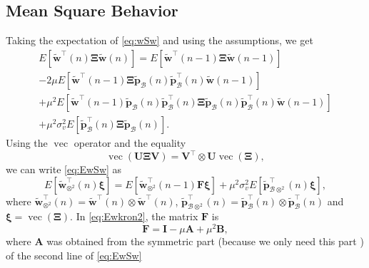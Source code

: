 \subsection{Mean Square Behavior}
Taking the expectation of \eqref{eq:wSw} and using the assumptions, we get
\begin{multline}
    E\left[ \tilde{\mathbf{w}}^\top(n)\boldsymbol{\Xi}\tilde{\mathbf{w}}(n)\right] = E\left[ \tilde{\mathbf{w}}^\top(n-1)\boldsymbol{\Xi}\tilde{\mathbf{w}}(n-1) \right]\\
    - 2\mu E\left[ \tilde{\mathbf{w}}^\top(n-1)\boldsymbol{\Xi}\tilde{\mathbf{p}}_{\mathcal{B}}(n)\tilde{\mathbf{p}}_{\mathcal{B}}^\top(n)\tilde{\mathbf{w}}(n-1) \right]\\
    +\mu^2 E\left[\tilde{\mathbf{w}}^{\top}(n-1)\tilde{\mathbf{p}}_{\mathcal{B}}(n)\tilde{\mathbf{p}}^\top_{\mathcal{B}}(n)\boldsymbol{\Xi}\tilde{\mathbf{p}}_{\mathcal{B}}(n)\tilde{\mathbf{p}}_{\mathcal{B}}^\top(n)\tilde{\mathbf{w}}(n-1)\right]\\
    +\mu^2 \sigma_{v}^2E\left[ \tilde{\mathbf{p}}^\top_{\mathcal{B}}(n)\boldsymbol{\Xi}\tilde{\mathbf{p}}_{\mathcal{B}}(n) \right].\label{eq:EwSw}
\end{multline}
Using the $\operatorname{vec}$ operator and the equality
\begin{equation*}
    \operatorname{vec}\left(\mathbf{U}\boldsymbol{\Xi}\mathbf{V}\right) = \mathbf{V}^\top\otimes\mathbf{U}\operatorname{vec}\left(\boldsymbol{\Xi}\right),
\end{equation*}
we can write \eqref{eq:EwSw} as
\begin{equation}
    E\left[ \tilde{\mathbf{w}}^\top_{\otimes^2}(n) \boldsymbol{\xi}\right] = E\left[ \tilde{\mathbf{w}}^\top_{\otimes^2}(n-1) \mathbf{F}\boldsymbol{\xi}\right] +\mu^2 \sigma_{v}^2E\left[ \tilde{\mathbf{p}}^\top_{\mathcal{B}\otimes^2}(n)\boldsymbol{\xi} \right],\label{eq:Ewkron2}
\end{equation}
where $\tilde{\mathbf{w}}^\top_{\otimes^2}(n) = \tilde{\mathbf{w}}^\top(n)\otimes \tilde{\mathbf{w}}^\top(n)$, $ \tilde{\mathbf{p}}^\top_{\mathcal{B}\otimes^2}(n) = \tilde{\mathbf{p}}^\top_\mathcal{B}(n) \otimes \tilde{\mathbf{p}}^\top_\mathcal{B}(n) $ and $\boldsymbol{\xi} = \operatorname{vec}(\boldsymbol{\Xi})$.
In \eqref{eq:Ewkron2}, the matrix $\mathbf{F}$ is
\begin{equation*}
    \mathbf{F} = \mathbf{I} -\mu\mathbf{A} + \mu^2\mathbf{B},
\end{equation*}
where $\mathbf{A}$ was obtained from the symmetric part (because we only need this part \cite{horn_matrix_2017}) of the second line of \eqref{eq:EwSw}
